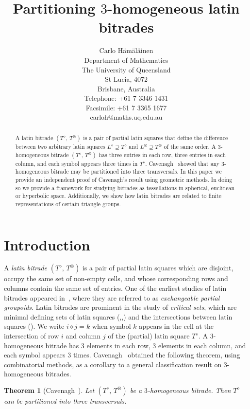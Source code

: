 \documentclass[amstags,fleqn,reqno]{article}
\title{Partitioning $3$-homogeneous latin bitrades}
\author{Carlo H\"{a}m\"{a}l\"{a}inen \\
Department of Mathematics\\ The University of Queensland\\
St Lucia, 4072 \\
Brisbane, Australia\\
Telephone: +61 7 3346 1431\\ 
Facsimile: +61 7 3365 1677 \\
carloh@maths.uq.edu.au}
\theoremstyle{plain}
\newtheorem{theorem}{Theorem}[section]
\theoremstyle{definition}
\newcommand{\opa}{\diamond}
\newcommand{\opb}{\otimes}
\begin{document}
\maketitle

\begin{abstract}
A latin bitrade $(T^{\diamond},\, T^{\otimes})$ 
is a pair of partial latin squares that define the difference between
two arbitrary latin squares $L^{\diamond} \supseteq T^{\diamond}$
and $L^{\otimes} \supseteq T^{\otimes}$ of the same order. A $3$-homogeneous bitrade 
$(T^{\diamond},\, T^{\otimes})$ has three
entries in each row, three entries in each column, and each symbol
appears three times in $T^{\diamond}$. Cavenagh~\cite{MR2241536} showed that any
$3$-homogeneous bitrade may be partitioned into three transversals.
In this paper we provide an independent
proof of Cavenagh's result using geometric methods. In doing so we provide a
framework for studying bitrades as tessellations in spherical, euclidean
or hyperbolic space. Additionally, we show how latin bitrades are
related to finite representations of certain triangle groups.
\end{abstract}

\section{Introduction}

A {\em latin bitrade} $(T^{\opa},\, T^{\opb})$ is a pair of partial
latin squares which are disjoint, occupy the same set of non-empty
cells, and whose corresponding rows and columns contain the same set
of entries. One of the earliest studies of latin bitrades appeared 
in~\cite{DrKe1}, where they are referred to as {\em exchangeable partial
groupoids}. Latin bitrades are prominent in the study of 
{\em critical sets}, which are minimal defining sets of latin squares
(\cite{BaRe2},\cite{codose},\cite{Ke2}) and the intersections
between latin squares (\cite{Fu}). We write $i \opa j = k$ when
symbol $k$ appears in the cell at the intersection of row $i$ and column
$j$ of the (partial) latin square $T^{\opa}$. A $3$-homogeneous bitrade
has $3$ elements in each row, $3$ elements in each column, and each
symbol appears $3$ times. Cavenagh~\cite{MR2241536} obtained the
following theorem, using combinatorial methods,
as a corollary to a general classification result
on $3$-homogeneous bitrades. 

\begin{theorem}[Cavenagh~\cite{MR2241536}]\label{theorem3homTransversals}
Let $(T^{\opa},\, T^{\opb})$ be a $3$-homogeneous bitrade. Then
$T^{\opa}$ can be partitioned into three transversals.  
\end{theorem}
\end{document}
